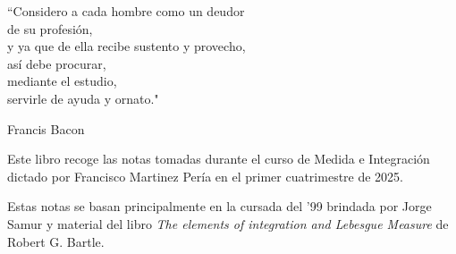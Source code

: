 \epigraph{``Considero a cada hombre como un deudor \\ de su profesión, \\ y ya que de ella recibe sustento y provecho, \\ así debe procurar, \\ mediante el estudio, \\ servirle de ayuda y ornato."}{Francis Bacon}

Este libro recoge las notas tomadas durante el curso de Medida e Integración dictado por Francisco Martinez Pería en el primer cuatrimestre de 2025.

Estas notas se basan principalmente en la cursada del '99 brindada por Jorge Samur y material del libro \textit{The elements of integration and Lebesgue Measure} de Robert G. Bartle.
